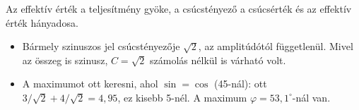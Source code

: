 \begin{center}\end{center}

Az effektív érték a teljesítmény gyöke, a csúcstényező a csúcsérték és az effektív érték hányadosa.

\begin{center}\end{center}

\begin{center}\end{center}
\begin{eredmeny}

\begin{center}\end{center}
\end{eredmeny}
\begin{tipp}[Ellenőrzés]
\begin{itemize}
\item Bármely szinuszos jel csúcstényezője $\sqrt2$, az amplitúdótól függetlenül. Mivel az összeg is szinusz, $C=\sqrt2$ számolás nélkül is várható volt.
\end{itemize}
\end{tipp}
\begin{figyelem}
\begin{itemize}
\item A maximumot ott keresni, ahol $\sin=\cos$ (45\textdegree{}-nál): ott $3/\sqrt2+4/\sqrt2=4{,}95$, ez kisebb 5-nél. A maximum $\varphi=53{,}1^{\circ}$-nál van.
\end{itemize}
\end{figyelem}


